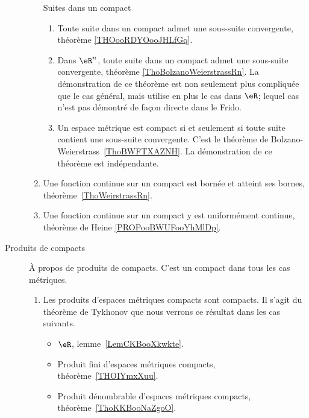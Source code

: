 \begin{description}
\begin{enumerate}
		            Suites dans un compact
		            \begin{enumerate}
			            \item
			                  Toute suite dans un compact admet une sous-suite convergente, théorème \ref{THOooRDYOooJHLfGq}.
			            \item
			                  Dans \( \eR^n\), toute suite dans un compact admet une sous-suite convergente, théorème \ref{ThoBolzanoWeierstrassRn}. La démonstration de ce théorème est non seulement plus compliquée que le cas général, mais utilise en plus le cas dans \( \eR\); lequel cas n'est pas démontré de façon directe dans le Frido.
			            \item
			                  Un espace métrique est compact si et seulement si toute suite contient une sous-suite convergente. C'est le théorème de Bolzano-Weierstrass~\ref{ThoBWFTXAZNH}. La démonstration de ce théorème est indépendante.
		            \end{enumerate}
		      \item
		            Une fonction continue sur un compact est bornée et atteint ses bornes, théorème~\ref{ThoWeirstrassRn}.
		      \item
		            Une fonction continue sur un compact y est uniformément continue, théorème de Heine \ref{PROPooBWUFooYhMlDp}.
	      \end{enumerate}

	\item[Produits de compacts]
	      À propos de produits de compacts. C'est un compact dans tous les cas métriques.
	      \begin{enumerate}
		      \item
		            Les produits d'espaces métriques compacts sont compacts. Il s'agit du théorème de Tykhonov que nous verrons ce résultat dans les cas suivants.
		            \begin{itemize}
			            \item
			                  \( \eR\), lemme~\ref{LemCKBooXkwkte}.
			            \item
			                  Produit fini d'espaces métriques compacts, théorème~\ref{THOIYmxXuu}.
			            \item
			                  Produit dénombrable d'espaces métriques compacts, théorème~\ref{ThoKKBooNaZgoO}.
		            \end{itemize}
	      \end{enumerate}
\end{description}


